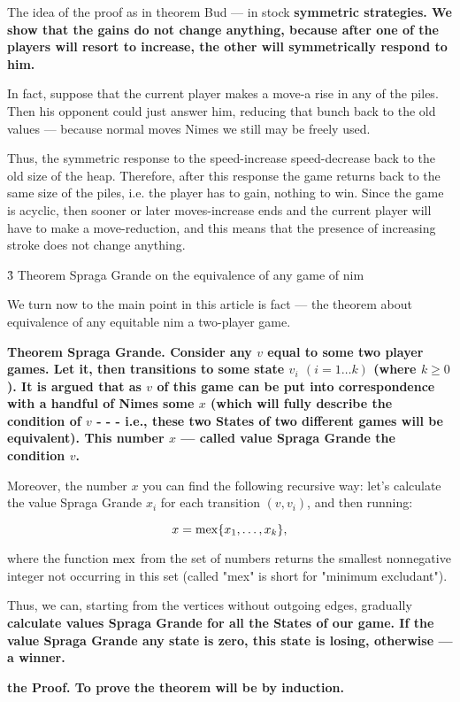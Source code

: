 The idea of the proof as in theorem Bud --- in stock \bf{symmetric strategies}. We show that the gains do not change anything, because after one of the players will resort to increase, the other will symmetrically respond to him.

In fact, suppose that the current player makes a move-a rise in any of the piles. Then his opponent could just answer him, reducing that bunch back to the old values --- because normal moves Nimes we still may be freely used.

Thus, the symmetric response to the speed-increase speed-decrease back to the old size of the heap. Therefore, after this response the game returns back to the same size of the piles, i.e. the player has to gain, nothing to win. Since the game is acyclic, then sooner or later moves-increase ends and the current player will have to make a move-reduction, and this means that the presence of increasing stroke does not change anything.


\h3{ Theorem Spraga Grande on the equivalence of any game of nim }

We turn now to the main point in this article is fact --- the theorem about equivalence of any equitable nim a two-player game.

\bf{Theorem Spraga Grande}. Consider any $v$ equal to some two player games. Let it, then transitions to some state $v_i$ $(i=1 \ldots k)$ (where $k \ge 0$). It is argued that as $v$ of this game can be put into correspondence with a handful of Nimes some $x$ (which will fully describe the condition of $v$ - - - i.e., these two States of two different games will be equivalent). This number $x$ --- called \bf{value Spraga Grande} the condition $v$.

Moreover, the number $x$ you can find the following recursive way: let's calculate the value Spraga Grande $x_i$ for each transition $(v,v_i)$, and then running:

$$ x = {\rm mex} \{ x_1, \ldots, x_k \}, $$

where the function $\rm mex$ from the set of numbers returns the smallest nonnegative integer not occurring in this set (called "mex" is short for "minimum excludant").

Thus, we can, starting from the vertices without outgoing edges, gradually \bf{calculate values Spraga Grande for all the States of our game}. If the value Spraga Grande any state is zero, this state is losing, otherwise --- a winner.

\bf{the Proof}. To prove the theorem will be by induction.

